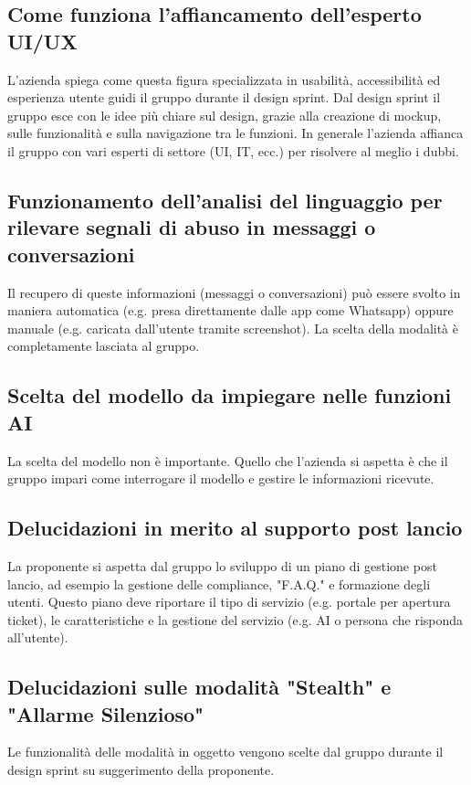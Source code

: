 \documentclass[a4paper, 10pt, colorlinks=true, linkcolor=black, urlcolor=blue, citecolor=blue, hidelinks]{article}
\begin{document}
\subsection{Come funziona l'affiancamento dell'esperto UI/UX}
L'azienda spiega come questa figura specializzata in usabilità, accessibilità ed esperienza utente guidi il gruppo durante il design sprint. Dal design sprint il gruppo esce con le idee più chiare sul design, grazie alla creazione di mockup, sulle funzionalità e sulla navigazione tra le funzioni. In generale l'azienda affianca il gruppo con vari esperti di settore (UI, IT, ecc.) per risolvere al meglio i dubbi.

\subsection{Funzionamento dell'analisi del linguaggio per rilevare segnali di abuso in messaggi o conversazioni}
Il recupero di queste informazioni (messaggi o conversazioni) può essere svolto in maniera automatica (e.g. presa direttamente dalle app come Whatsapp) oppure manuale (e.g. caricata dall'utente tramite screenshot). La scelta della modalità è completamente lasciata al gruppo.

\subsection{Scelta del modello da impiegare nelle funzioni AI}
La scelta del modello non è importante. Quello che l'azienda si aspetta è che il gruppo impari come interrogare il modello e gestire le informazioni ricevute.

\subsection{Delucidazioni in merito al supporto post lancio}
La proponente si aspetta dal gruppo lo sviluppo di un piano di gestione post lancio, ad esempio la gestione delle compliance, "F.A.Q." e formazione degli utenti. Questo piano deve riportare il tipo di servizio (e.g. portale per apertura ticket), le caratteristiche e la gestione del servizio (e.g. AI o persona che risponda all'utente).

\subsection{Delucidazioni sulle modalità "Stealth" e "Allarme Silenzioso"}
Le funzionalità delle modalità in oggetto vengono scelte dal gruppo durante il design sprint su suggerimento della proponente.
\end{document}
